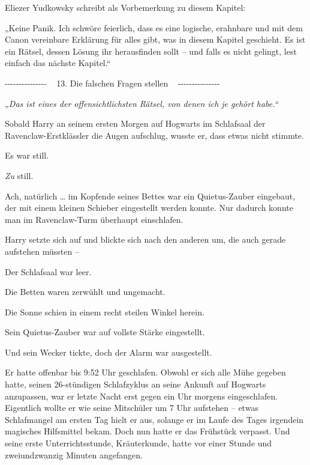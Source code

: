 

\hypertarget{die-falschen-fragen-stellen}{%

Eliezer Yudkowsky schreibt als Vorbemerkung zu diesem Kapitel:

„Keine Panik. Ich schwöre feierlich, dass es eine logische, erahnbare und mit dem Canon vereinbare Erklärung für alles gibt, was in diesem Kapitel geschieht. Es ist ein Rätsel, dessen Lösung ihr herausfinden sollt -- und falls es nicht gelingt, lest einfach das nächste Kapitel.“

-\/-\/-\/-\/-\/-\/-\/-\/-\/-\/-\/-\/-\/-\/- ~ 13. Die falschen Fragen stellen ~ -\/-\/-\/-\/-\/-\/-\/-\/-\/-\/-\/-\/-\/-\/-

\later

\emph{„Das ist eines der offensichtlichsten Rätsel, von denen ich je gehört habe.“}

\later

Sobald Harry an seinem ersten Morgen auf Hogwarts im Schlafsaal der Ravenclaw-Erstklässler die Augen aufschlug, wusste er, dass etwas nicht stimmte.

Es war still.

\emph{Zu} still.

Ach, natürlich … im Kopfende seines Bettes war ein Quietus-Zauber eingebaut, der mit einem kleinen Schieber eingestellt werden konnte. Nur dadurch konnte man im Ravenclaw-Turm überhaupt einschlafen.

Harry setzte sich auf und blickte sich nach den anderen um, die auch gerade aufstehen müssten --

Der Schlafsaal war leer.

Die Betten waren zerwühlt und ungemacht.

Die Sonne schien in einem recht steilen Winkel herein.

Sein Quietus-Zauber war auf vollste Stärke eingestellt.

Und sein Wecker tickte, doch der Alarm war ausgestellt.

Er hatte offenbar bis 9:52 Uhr geschlafen. Obwohl er sich alle Mühe gegeben hatte, seinen 26-stündigen Schlafzyklus an seine Ankunft auf Hogwarts anzupassen, war er letzte Nacht erst gegen ein Uhr morgens eingeschlafen. Eigentlich wollte er wie seine Mitschüler um 7 Uhr aufstehen -- etwas Schlafmangel am ersten Tag hielt er aus, solange er im Laufe des Tages irgendein magisches Hilfsmittel bekam. Doch nun hatte er das Frühstück verpasst. Und seine erste Unterrichtsstunde, Kräuterkunde, hatte vor einer Stunde und zweiundzwanzig Minuten angefangen.

}
